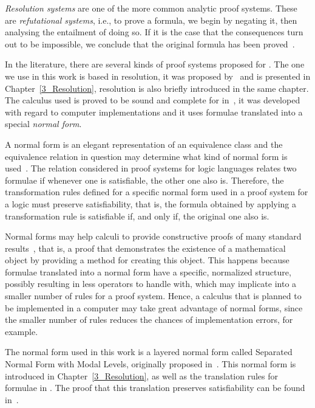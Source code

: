 \emph{Resolution systems} are one of the more common analytic proof systems.
These are \emph{refutational systems}, i.e., to prove a formula, we begin by
negating it, then analysing the entailment of doing so. If it is the case that
the consequences turn out to be impossible, we conclude that the original
formula has been proved~\cite{fitting}.

In the literature, there are several kinds of proof systems proposed for
. The one we use in this work is based in resolution, it was
proposed by~\cite{nalon2015modal} and is presented in
Chapter~\ref{3_Resolution}, resolution is also briefly introduced in the same
chapter. The calculus used is proved to be sound and complete for
 in~\cite{nalon2015modal}, it was developed with regard to
computer implementations and it uses formulae translated into a special
\emph{normal form}.

A normal form is an elegant representation of an equivalence class and the
equivalence relation in question may determine what kind of normal form is
used~\cite{normalformtheory}. The relation considered in proof systems for logic
languages relates two formulae if whenever one is satisfiable, the other one
also is. Therefore, the transformation rules defined for a specific normal form
used in a proof system for a logic must preserve satisfiability, that is, the
formula obtained by applying a transformation rule is satisfiable if, and only
if, the original one also is. 

Normal forms may help calculi to provide constructive proofs of many standard
results~\cite{fine1975}, that is, a proof that demonstrates the existence of a
mathematical object by providing a method for creating this object. This happens
because formulae translated into a normal form have a specific, normalized
structure, possibly resulting in less operators to handle with, which may
implicate into a smaller number of rules for a proof system. Hence, a calculus
that is planned to be implemented in a computer may take great advantage of
normal forms, since the smaller number of rules reduces the chances of
implementation errors, for example. 

The normal form used in this work is a layered normal form called Separated
Normal Form with Modal Levels, originally proposed
in~\cite{journals/jal/NalonD07}. This normal form is introduced in
Chapter~\ref{3_Resolution}, as well as the translation rules for formulae in
. The proof that this translation preserves satisfiability can be
found in~\cite{journals/jal/NalonD07}.
